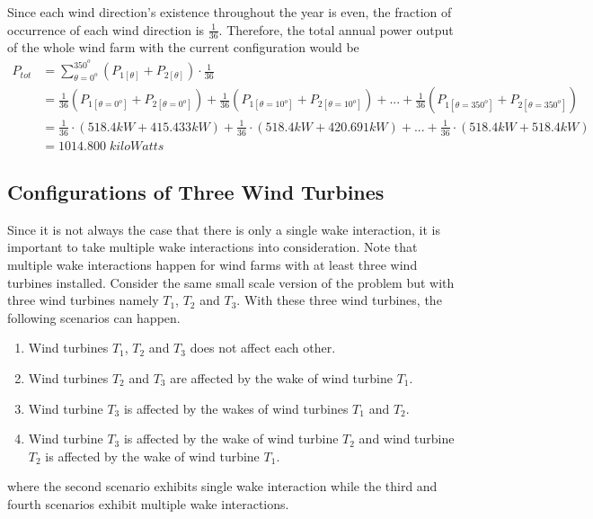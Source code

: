     Since each wind direction's existence throughout the year is even, the fraction of occurrence of each wind direction is $\frac{1}{36}$. Therefore, the total annual power output of the whole wind farm with the current configuration would be
    \begin{align*}
        P_{tot}
        &= \sum_{\theta=0^o}^{350^o} \left( P_{1[\theta]} + P_{2[\theta]} \right) \cdot \frac{1}{36} \\
        &= \frac{1}{36}\left( P_{1[\theta=0^o]} + P_{2[\theta=0^o]} \right) + \frac{1}{36}\left( P_{1[\theta=10^o]} + P_{2[\theta=10^o]} \right) +...+ \frac{1}{36}\left( P_{1[\theta=350^o]} + P_{2[\theta=350^o]} \right) \\
        &= \frac{1}{36}\cdot\left( 518.4kW+415.433kW \right) + \frac{1}{36}\cdot\left( 518.4kW +420.691kW \right) +...+ \frac{1}{36}\cdot\left(  518.4kW + 518.4kW \right) \\
        &=1014.800\;kiloWatts
    \end{align*}
    
\subsection{Configurations of Three Wind Turbines}
    Since it is not always the case that there is only a single wake interaction, it is important to take multiple wake interactions into consideration. Note that multiple wake interactions happen for wind farms with at least three wind turbines installed. Consider the same small scale version of the problem but with three wind turbines namely $T_1$, $T_2$ and $T_3$. With these three wind turbines, the following scenarios can happen.
    \begin{enumerate}
        \item Wind turbines $T_1$, $T_2$ and $T_3$ does not affect each other.
        \item Wind turbines $T_2$ and $T_3$ are affected by the wake of wind turbine $T_1$.
        \item Wind turbine $T_3$ is affected by the wakes of wind turbines $T_1$ and $T_2$.
        \item Wind turbine $T_3$ is affected by the wake of wind turbine $T_2$ and wind turbine $T_2$ is affected by the wake of wind turbine $T_1$.
    \end{enumerate}
    where the second scenario exhibits single wake interaction while the third and fourth scenarios exhibit multiple wake interactions.
    
